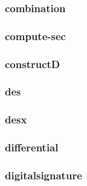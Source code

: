 \begin{frame}\frametitle{combination}
\begin{figure}
\begin{center}

\end{center}
\end{figure}
\end{frame}
\begin{frame}\frametitle{compute-sec}
\begin{figure}
\begin{center}

\end{center}
\end{figure}
\end{frame}
\begin{frame}\frametitle{constructD}
\begin{figure}
\begin{center}

\end{center}
\end{figure}
\end{frame}
\begin{frame}\frametitle{des}
\begin{figure}
\begin{center}

\end{center}
\end{figure}
\end{frame}
\begin{frame}\frametitle{desx}
\begin{figure}
\begin{center}

\end{center}
\end{figure}
\end{frame}
\begin{frame}\frametitle{differential}
\begin{figure}
\begin{center}

\end{center}
\end{figure}
\end{frame}
\begin{frame}\frametitle{digitalsignature}
\begin{figure}
\begin{center}

\end{center}
\end{figure}
\end{frame}
